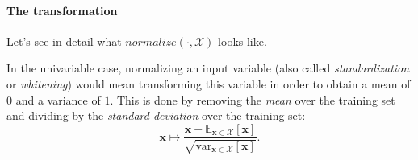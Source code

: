 \paragraph{The transformation}

Let's see in detail what $normalize(\cdot, \mathcal{X})$ looks like. 

In the univariable case, normalizing an input variable (also called \emph{standardization} or \emph{whitening}) would mean transforming this variable in order to obtain a mean of $0$ and a variance of $1$. This is done by removing the \emph{mean} over the training set and dividing by the \emph{standard deviation} over the training set:
\begin{equation}
    \mathbf{x} \mapsto \frac{ \mathbf{x} - \mathbb{E}_{\mathbf{x} \in \mathcal{X}}[\mathbf{x}]}{\sqrt{\mathrm{var}_{\mathbf{x} \in \mathcal{X}}[\mathbf{x}]}}.
\end{equation}




